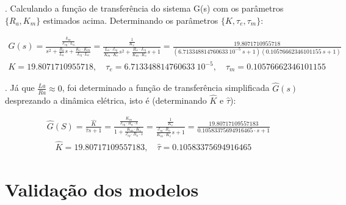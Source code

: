 \documentclass[10pt]{article}
\begin{document}
. Calculando a função de transferência do sistema G(s) com os parâmetros $\{ R_a, K_m \}$
estimados acima. Determinando os parâmetros $\{K,\tau_e, \tau_m\}$:

\begin{equation}
\begin{aligned}
    G(s) = \frac{\frac{k_m}{J_{eq} \cdot L_a}}{s^2 + \frac{R_a}{L_a}s + \frac{K_e \cdot K_m}{J_{eq} \cdot L_a}}
    = \frac{\frac{1}{K_e}}{\frac{L_a \cdot J_{eq}}{K_m \cdot K_e}s^2 + \frac{R_a \cdot J_{eq}}{K_m \cdot K_e}s + 1} = \frac{19.8071710955718}{(6.713348814760633 \ 10^{-5} \ s + 1)(0.10576662346101155 \ s + 1)} \\
    K = 19.8071710955718, \quad \tau_e = 6.713348814760633 \ 10^{-5}, \quad \tau_m = 0.10576662346101155
\end{aligned}
\end{equation}

. Já que $\frac{La}{Ra} \approx 0$, foi determinado a função de transferência simplificada $\hat{G}(s)$ desprezando a dinâmica elétrica, isto é (determinando $\hat{K}$ e $\hat{\tau}$):

\begin{equation}
\begin{aligned}
    \hat{G}(S) = \frac{\hat{K}}{\hat{\tau}s + 1}
    = \frac{\frac{K_m}{J_{eq} \cdot R_a \cdot s}}{1 + \frac{K_m \cdot K_e}{J_{eq} \cdot R_a \cdot s}}
    = \frac{\frac{1}{K_e}}{\frac{J_{eq} \cdot R_a}{K_m \cdot K_e}s + 1}
    = \frac{19.80717109557183}{0.10583375694916465 \cdot s + 1} \\
    \quad \hat{K} = 19.80717109557183,
    \quad \hat{\tau} = 0.10583375694916465 
\end{aligned}
\end{equation}

\section{Validação dos modelos}
\end{document}
